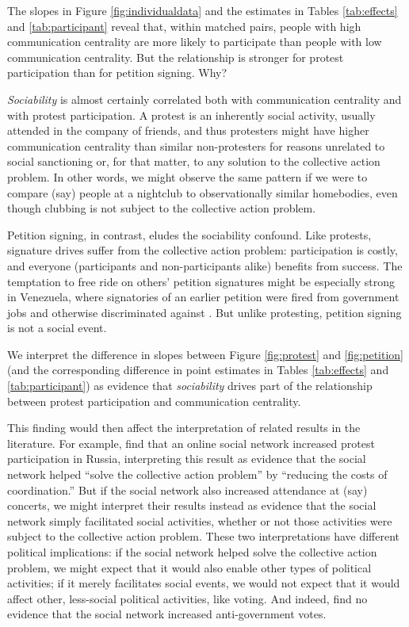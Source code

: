 \documentclass[12pt]{article}
\begin{document}
The slopes in Figure \ref{fig:individualdata} and the estimates in Tables \ref{tab:effects} and \ref{tab:participant} reveal that, within matched pairs, people with high communication centrality are more likely to participate than people with low communication centrality. But the relationship is stronger for protest participation than for petition signing. Why?

\emph{Sociability} is almost certainly correlated both with communication centrality and with protest participation. A protest is an inherently social activity, usually attended in the company of friends, and thus protesters might have higher communication centrality than similar non-protesters for reasons unrelated to social sanctioning or, for that matter, to any solution to the collective action problem. In other words, we might observe the same pattern if we were to compare (say) people at a nightclub to observationally similar homebodies, even though clubbing is not subject to the collective action problem.

Petition signing, in contrast, eludes the sociability confound. Like protests, signature drives suffer from the collective action problem: participation is costly, and everyone (participants and non-participants alike) benefits from success. The temptation to free ride on others' petition signatures might be especially strong in Venezuela, where signatories of an earlier petition were fired from government jobs and otherwise discriminated against \citep{Maisanta}. But unlike protesting, petition signing is not a social event.


We interpret the difference in slopes between Figure \ref{fig:protest} and \ref{fig:petition} (and the corresponding difference in point estimates in Tables \ref{tab:effects} and \ref{tab:participant}) as evidence that \emph{sociability} drives part of the relationship between protest participation and communication centrality.

This finding would then affect the interpretation of related results in the literature. For example, \citet{EnikopolovVK} find that an online social network increased protest participation in Russia, interpreting this result as evidence that the social network helped ``solve the collective action problem'' by ``reducing the costs of coordination.'' But if the social network also increased attendance at (say) concerts, we might interpret their results instead as evidence that the social network simply facilitated social activities, whether or not those activities were subject to the collective action problem. These two interpretations have different political implications: if the social network helped solve the collective action problem, we might expect that it would also enable other types of  political activities; if it merely facilitates social events, we would not expect that it would affect other, less-social political activities, like voting. And indeed, \citet{EnikopolovVK} find no evidence that the social network increased anti-government votes.
\end{document}
